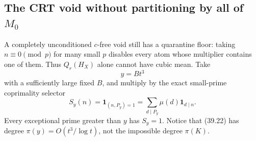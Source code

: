 \documentclass[10pt,reqno]{amsart}
\theoremstyle{definition}
\newcommand{\1}{\mathbf 1}
\begin{document}
\subsection{The CRT void without partitioning by all of $M_0$}
A completely unconditioned $c$-free void still has a quarantine floor:
taking $n\equiv0\pmod p$ for many small $p$ disables every atom whose
multiplier contains one of them.  Thus $Q_r(H_X)$ alone cannot have cubic
mean.  Take
\begin{equation}\tag{39.21}
 y=Bt^3
\end{equation}
with a sufficiently large fixed $B$, and multiply by the exact small-prime
coprimality selector
\begin{equation}\tag{39.22}
 S_y(n)=\mathbf1_{(n,P_y)=1}
 =\sum_{d\mid P_y}\mu(d)\mathbf1_{d\mid n}.
\end{equation}
Every exceptional prime greater than $y$ has $S_y=1$.  Notice that (39.22)
has degree $\pi(y)=O(t^3/\log t)$, not the impossible degree $\pi(K)$.
\end{document}
